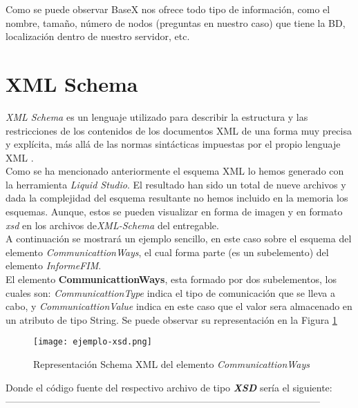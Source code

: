 \documentclass[11pt]{diazessay} %
\begin{document}
Como se puede observar BaseX nos ofrece todo tipo de información, como el nombre, tamaño, número de nodos (preguntas en nuestro caso) que tiene la BD, localización dentro de nuestro servidor, etc.


\newpage
\section*{XML Schema}
\textit{XML Schema} es un lenguaje utilizado para describir la estructura y las restricciones de los contenidos de los documentos XML de una forma muy precisa y explícita, más allá de las normas sintácticas impuestas por el propio lenguaje XML \cite{xml_schema}. \\

Como se ha mencionado anteriormente el esquema XML lo hemos generado con la herramienta \textit{Liquid Studio}. El resultado han sido un total de nueve archivos y dada la complejidad del esquema resultante no hemos incluido en la memoria los esquemas. Aunque, estos se pueden visualizar en forma de imagen y en formato \textit{xsd} en los archivos de\textit{XML-Schema} del entregable.\\

A continuación se mostrará un ejemplo sencillo, en este caso sobre el esquema del elemento \textit{CommunicattionWays}, el cual forma parte (es un subelemento) del elemento \textit{InformeFIM}.\\

El elemento \textbf{CommunicattionWays}, esta formado por dos subelementos, los cuales son: \textit{CommunicattionType} indica el tipo de comunicación que se lleva a cabo, y \textit{CommunicattionValue} indica en este caso que el valor sera almacenado en un atributo de tipo String. Se puede observar su representación en la Figura \ref{fig:ejemplo_xsd}\\

\begin{figure}[h!]
	\texttt{[image: ejemplo-xsd.png]}
	\caption{Representación Schema XML del elemento \textit{CommunicattionWays}}
	\label{fig:ejemplo_xsd}
\end{figure}


Donde el código fuente del respectivo archivo de tipo \textit{\textbf{XSD}} sería el siguiente:\\

 

--------------------------------------------------------------------------------------------------\\
\end{document}
